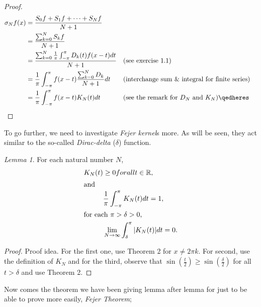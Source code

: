\documentclass{article}
\theoremstyle{remark}
\theoremstyle{lemma}
\newtheorem{lemma}{Lemma}
\theoremstyle{example}
\theoremstyle{proofTrial}
\theoremstyle{definition}
\begin{document}
\begin{proof}
    \begin{align*}
    \sigma_Nf(x) &= \frac{S_0f + S_1f + \dots + S_Nf}{N+1}\\
                 &= \frac{\sum_{k = 0}^{N}S_kf}{N+1} \\
                 &= \frac{\sum_{k = 0}^{N}\frac{1}{\pi}\int_{-\pi}^{\pi}D_k(t)f(x-t)dt}{N+1} &&\text{(see exercise 1.1)}\\
                 &= \frac{1}{\pi}\int_{-\pi}^{\pi}f(x-t)\frac{\sum_{k = 0}^{N}D_k}{N+1}dt &&\text{(interchange sum \& integral for finite series)}\\
                 &= \frac{1}{\pi}\int_{-\pi}^{\pi}f(x-t)K_N(t)dt &&\text{(see the remark for $D_N$ and $K_N$)}\qedheres
    \end{align*}
\end{proof}
\par
To go further, we need to investigate \textit{Fejer kernel}s more. As will be seen, they act similar to the so-called \textit{Dirac-delta} ($\delta$) function.
\begin{lemma}
    For each natural number $N$,
    \begin{align}
        K_N(t) &\geq 0 for all t \in \mathbb{R},\\
        \intertext{and}
        &\frac{1}{\pi}\int_{-\pi}^{\pi} K_N(t)dt = 1,\\
        \intertext{for each  $\pi > \delta > 0$,}
        &\lim_{N \to \infty} \int_{\delta}^{\pi}|K_N(t)|dt = 0.
    \end{align}
\end{lemma}
\begin{proof}{Proof idea.}
    For the first one, use Theorem 2 for $x \neq 2\pi k$. For second, use the definition of $K_N$ and for the third, observe that $\sin(\frac{t}{2}) \geq \sin(\frac{\delta}{2})$ for all $t > \delta$ and use Theorem 2.
\end{proof}

Now comes the theorem we have been giving lemma after lemma for just to be able to prove more easily, \textit{Fejer Theorem};
\end{document}
